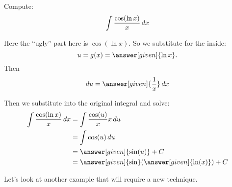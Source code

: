 \documentclass{ximera}
\begin{document}
\begin{example}
  Compute:
  \[
  \int \frac{\cos(\ln x)}{x} \mathop{}\!d x
  \]
\begin{explanation}
Here the ``ugly'' part here is $\cos(\ln x)$.  So we substitute for
the inside:
\[
u=g(x)=\answer[given]{\ln x}.
\]
Then
\[
\d u =  \answer[given]{\frac{1}{x}} \d x 	
\]

Then we substitute into the original integral and solve:
\begin{align*}
\int\frac{\cos(\ln x)}{x} \d x &= \int\frac{\cos(u)}{x} x \d u  \\
&= \int \cos(u) \d u  \\
&= {\answer[given]{\sin(u)}}+C\\
&= \answer[given]{\sin}(\answer[given]{\ln(x)})+C
\end{align*}
\end{explanation}
\end{example}
Let's look at another example that will require a new technique.
\end{document}
